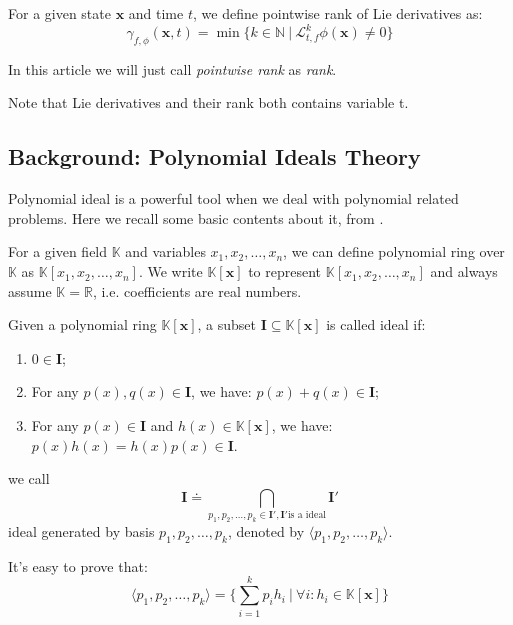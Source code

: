 \documentclass{article}
\begin{document}
\begin{Definition}
\label{def:lieRank}
For a given state $\boldsymbol{x}$ and time $t$, we define pointwise rank of Lie derivatives as: 
\[
	\gamma_{f,\phi}(\boldsymbol{x}, t) = \min\{k \in \mathbb{N}\ |\ \mathcal{L}_{t, f}^k \phi (\boldsymbol{x}) \neq 0\}
\]
\end{Definition}

In this article we will just call \emph{pointwise rank} as \emph{rank}.

Note that Lie derivatives and their rank both contains variable t.

\subsection{Background: Polynomial Ideals Theory}
Polynomial ideal is a powerful tool when we deal with polynomial related problems. Here we recall some basic contents about it, from \cite{cox1992ideals}.

For a given field $\mathbb{K}$ and variables $x_1, x_2, \dots, x_n$, we can define polynomial ring over $\mathbb{K}$ as $\mathbb{K}[x_1, x_2, \dots, x_n]$. We write $\mathbb{K}[\boldsymbol{x}]$ to represent $\mathbb{K}[x_1, x_2, \dots, x_n]$ and always assume $\mathbb{K} = \mathbb{R}$, i.e. coefficients are real numbers. 

\begin{Definition}
Given a polynomial ring $\mathbb{K}[\boldsymbol{x}]$, a subset $\boldsymbol{I} \subseteq \mathbb{K}[\boldsymbol{x}]$ is called ideal if:
	\begin{enumerate}
		\item $0 \in \boldsymbol{I}$;
		\item For any $p(x), q(x) \in \boldsymbol{I}$, we have: $p(x)+q(x) \in \boldsymbol{I}$;
		\item For any $p(x) \in \boldsymbol{I}$ and $h(x) \in \mathbb{K}[\boldsymbol{x}]$, we have: $p(x)h(x) = h(x)p(x) \in \boldsymbol{I}$.
	\end{enumerate}
\end{Definition}

\begin{Definition}
we call
	\begin{displaymath}
		\boldsymbol{I} \doteq \bigcap_{p_1,p_2,\dots,p_k \in \boldsymbol{I}', \boldsymbol{I}'\text{is a ideal} }\boldsymbol{I}'
	\end{displaymath}
ideal generated by basis $p_1,p_2,\dots, p_k$, denoted by $\langle p_1, p_2, \dots, p_k \rangle$.

It's easy to prove that:
	\begin{displaymath}
		\langle p_1, p_2, \dots, p_k \rangle = \{\sum_{i=1}^k p_ih_i\ |\ \forall i : h_i \in \mathbb{K}[\boldsymbol{x}]\}
	\end{displaymath}
\end{Definition}
\end{document}
